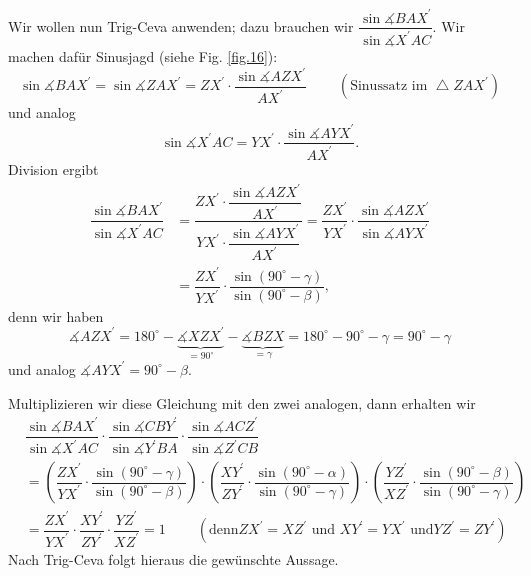 \documentclass[12pt,final,notitlepage,onecolumn,german]{article}%
\theoremstyle{definition}
\theoremstyle{plainsl}
\begin{document}
Wir wollen nun Trig-Ceva anwenden; dazu brauchen wir $\dfrac{\sin
\measuredangle BAX^{\prime}}{\sin\measuredangle X^{\prime}AC}$. Wir machen
daf\"{u}r Sinusjagd (siehe Fig. \ref{fig.16}):%
\[
\sin\measuredangle BAX^{\prime}=\sin\measuredangle ZAX^{\prime}=ZX^{\prime
}\cdot\dfrac{\sin\measuredangle AZX^{\prime}}{AX^{\prime}}%
\ \ \ \ \ \ \ \ \ \ \left(  \text{Sinussatz im }\bigtriangleup ZAX^{\prime
}\right)
\]
und analog%
\[
\sin\measuredangle X^{\prime}AC=YX^{\prime}\cdot\dfrac{\sin\measuredangle
AYX^{\prime}}{AX^{\prime}}.
\]
Division ergibt%
\begin{align*}
\dfrac{\sin\measuredangle BAX^{\prime}}{\sin\measuredangle X^{\prime}AC}  &
=\dfrac{ZX^{\prime}\cdot\dfrac{\sin\measuredangle AZX^{\prime}}{AX^{\prime}}%
}{YX^{\prime}\cdot\dfrac{\sin\measuredangle AYX^{\prime}}{AX^{\prime}}}%
=\dfrac{ZX^{\prime}}{YX^{\prime}}\cdot\dfrac{\sin\measuredangle AZX^{\prime}%
}{\sin\measuredangle AYX^{\prime}}\\
&  =\dfrac{ZX^{\prime}}{YX^{\prime}}\cdot\dfrac{\sin\left(  90^{\circ}%
-\gamma\right)  }{\sin\left(  90^{\circ}-\beta\right)  },
\end{align*}
denn wir haben
\[
\measuredangle AZX^{\prime}=180^{\circ}-\underbrace{\measuredangle
XZX^{\prime}}_{=90^{\circ}}-\underbrace{\measuredangle BZX}_{=\gamma
}=180^{\circ}-90^{\circ}-\gamma=90^{\circ}-\gamma
\]
und analog $\measuredangle AYX^{\prime}=90^{\circ}-\beta$.

Multiplizieren wir diese Gleichung mit den zwei analogen, dann erhalten wir%
\begin{align*}
&  \dfrac{\sin\measuredangle BAX^{\prime}}{\sin\measuredangle X^{\prime}%
AC}\cdot\dfrac{\sin\measuredangle CBY^{\prime}}{\sin\measuredangle Y^{\prime
}BA}\cdot\dfrac{\sin\measuredangle ACZ^{\prime}}{\sin\measuredangle Z^{\prime
}CB}\\
&  =\left(  \dfrac{ZX^{\prime}}{YX^{\prime}}\cdot\dfrac{\sin\left(  90^{\circ
}-\gamma\right)  }{\sin\left(  90^{\circ}-\beta\right)  }\right)  \cdot\left(
\dfrac{XY^{\prime}}{ZY^{\prime}}\cdot\dfrac{\sin\left(  90^{\circ}%
-\alpha\right)  }{\sin\left(  90^{\circ}-\gamma\right)  }\right)  \cdot\left(
\dfrac{YZ^{\prime}}{XZ^{\prime}}\cdot\dfrac{\sin\left(  90^{\circ}%
-\beta\right)  }{\sin\left(  90^{\circ}-\gamma\right)  }\right) \\
&  =\dfrac{ZX^{\prime}}{YX^{\prime}}\cdot\dfrac{XY^{\prime}}{ZY^{\prime}}%
\cdot\dfrac{YZ^{\prime}}{XZ^{\prime}}=1\ \ \ \ \ \ \ \ \ \ \left(  \text{denn
}ZX^{\prime}=XZ^{\prime}\text{ und }XY^{\prime}=YX^{\prime}\text{ und
}YZ^{\prime}=ZY^{\prime}\right)
\end{align*}
Nach Trig-Ceva folgt hieraus die gew\"{u}nschte Aussage.
\end{document}
